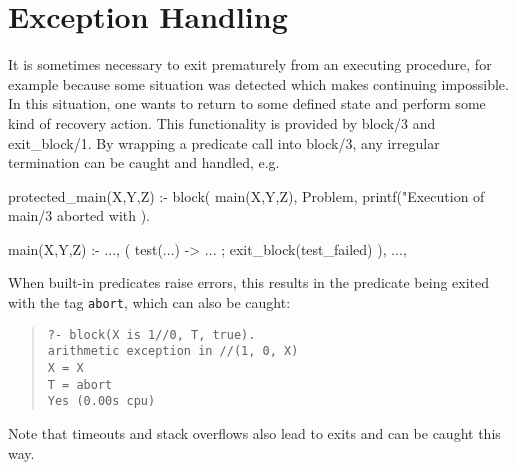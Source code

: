 


\section{Exception Handling}

It is sometimes necessary to exit prematurely from an executing
procedure, for example because some situation was detected which
makes continuing impossible.
In this situation, one wants to return to some defined state and
perform some kind of recovery action.
This functionality is provided by block/3 and exit_block/1.
By wrapping a predicate call into block/3, any irregular termination
can be caught and handled, e.g.
\begin{code}
protected_main(X,Y,Z) :-
    block(
        main(X,Y,Z),
        Problem,
        printf("Execution of main/3 aborted with %
    ).

main(X,Y,Z) :-
    ...,
    ( test(...) -> ... ; exit_block(test_failed) ),
    ...,
\end{code}
When built-in predicates raise errors, this results in the predicate
being exited with the tag \verb.abort., which can also be caught:
\begin{quote}\begin{verbatim}
?- block(X is 1//0, T, true).
arithmetic exception in //(1, 0, X)
X = X
T = abort
Yes (0.00s cpu)
\end{verbatim}\end{quote}
Note that timeouts and stack overflows also lead to exits and can be
caught this way.


